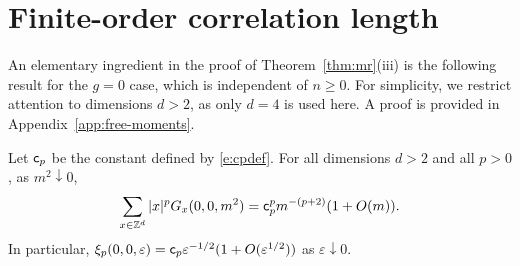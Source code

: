 \section{Finite-order correlation length}

An elementary ingredient in the proof of Theorem~\ref{thm:mr}(iii) is the following result
for the $g=0$ case, which is independent of $n\ge 0$.
For simplicity, we restrict attention to dimensions $d>2$, as only $d=4$ is used here.
A proof is provided in Appendix~\ref{app:free-moments}.

\begin{prop}\label{prop:Gab-free-moment-estimate}
Let ${\sf c}_p$ be the constant defined by \eqref{e:cpdef}.
For all dimensions $d>2$ and all $p>0$,
as $m^2 \downarrow 0$,
\begin{equation}
\label{e:Gab-free-moment-estimate}
\sum_{x\in{ {{\mathbb Z}}^d }} |x|^p G_{x}(0, 0, m^2)
=
{\sf c}_p^p m^{-(p + 2)} (1 + O(m)).
\end{equation}
In particular, $\xi_p(0,0,\varepsilon) = {\sf c}_p \varepsilon^{-1/2}
(1+O(\varepsilon^{1/2}))$ as $\varepsilon \downarrow 0$.
\end{prop}



